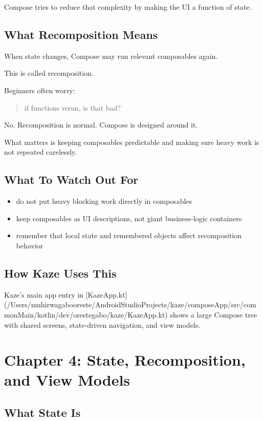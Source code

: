 \documentclass[11pt,a4paper]{article}
\begin{document}
Compose tries to reduce that complexity by making the UI a function of state.

\subsection{What Recomposition Means}

When state changes, Compose may run relevant composables again.

This is called recomposition.

Beginners often worry:
\begin{quote}
if functions rerun, is that bad?
\end{quote}

No. Recomposition is normal. Compose is designed around it.

What matters is keeping composables predictable and making sure heavy work is not repeated carelessly.

\subsection{What To Watch Out For}

\begin{itemize}
    \item do not put heavy blocking work directly in composables
    \item keep composables as UI descriptions, not giant business-logic containers
    \item remember that local state and remembered objects affect recomposition behavior
\end{itemize}

\subsection{How Kaze Uses This}

Kaze's main app entry in [KazeApp.kt](/Users/muhirwagabooreste/AndroidStudioProjects/kaze/composeApp/src/commonMain/kotlin/dev/orestegabo/kaze/KazeApp.kt) shows a large Compose tree with shared screens, state-driven navigation, and view models.

\section{Chapter 4: State, Recomposition, and View Models}

\subsection{What State Is}
\end{document}
